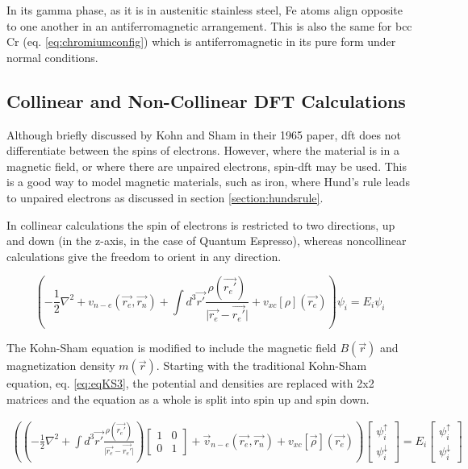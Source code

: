 In its gamma phase, as it is in austenitic stainless steel, \Gls{Fe} atoms align opposite to one another in an antiferromagnetic arrangement.  This is also the same for \acrshort{bcc} \Gls{Cr} (eq. \ref{eq:chromiumconfig})  which is antiferromagnetic in its pure form under normal conditions.

 





\subsection{Collinear and Non-Collinear DFT Calculations}

Although briefly discussed by Kohn and Sham in their 1965 paper\cite{kohnsham}, \acrshort{dft} does not differentiate between the spins of electrons.  However, where the material is in a magnetic field, or where there are unpaired electrons, spin-\acrshort{dft} may be used.  This is a good way to model magnetic materials, such as iron, where Hund's rule leads to unpaired electrons as discussed in section \ref{section:hundsrule}.  

In collinear calculations the spin of electrons is restricted to two directions, up and down (in the z-axis, in the case of Quantum Espresso), whereas noncollinear calculations give the freedom to orient in any direction. 

\begin{equation}
\left( -\frac{1}{2} \nabla^2 + v_{n-e}(\vec{r_e}, \vec{r_n}) + \int d^3\vec{r'} \frac{\rho(\vec{r_{e}'})}{\lvert \vec{r_{e}} - \vec{r_{e}'} \rvert } + v_{xc}[\rho](\vec{r_{e}}) \right) \psi_{i} = E_{i} \psi_{i}
\label{eq:eqKS3}
\end{equation}

The Kohn-Sham equation is modified to include the magnetic field $B(\vec{r})$ and magnetization density $m(\vec{r})$\cite{spindft1}\cite{spindft2}.  Starting with the traditional Kohn-Sham equation, eq. \ref{eq:eqKS3}, the potential and densities are replaced with 2x2 matrices and the equation as a whole is split into spin up and spin down.

\begin{equation}
\begin{split}
\left(\left(-\frac{1}{2} \nabla^2  + \int d^3\vec{r'} \frac{\rho(\vec{r_{e}'})}{\lvert \vec{r_{e}} - \vec{r_{e}'} \rvert} \right) \begin{bmatrix} 1 & 0 \\ 0 & 1 \end{bmatrix} + \vec{v}_{n-e}(\vec{r_e}, \vec{r_n}) + v_{xc}[\vec{\rho}](\vec{r_{e}}) \right) \begin{bmatrix} \psi^{\uparrow}_{i} \\ \psi^{\downarrow}_{i} \end{bmatrix} = E_i \begin{bmatrix} \psi^{\uparrow}_{i} \\ \psi^{\downarrow}_{i} \end{bmatrix} 
\label{eq:eqKSSDFT1}
\end{split}
\end{equation}

